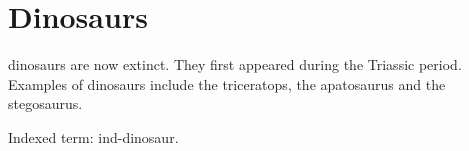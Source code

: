 \documentclass{report}
\begin{document}
\tableofcontents

\chapter{Dinosaurs}

\Glspl{dinosaur} are now extinct. They first appeared during the
\gls{Triassic} period. Examples of \glspl{dinosaur} include the
\gls{triceratops}, the \gls{apatosaurus} and the \gls{stegosaurus}.

Indexed term: \gls{ind-dinosaur}.

\renewcommand*{\glsnamefont}[1]{\textbf{\makefirstuc{#1}}}

\printglossary[style=long,nogroupskip]

\renewcommand*{\glsnamefont}[1]{\textmd{#1}}

\printindex[style=mcolindexgroup]
\end{document}
